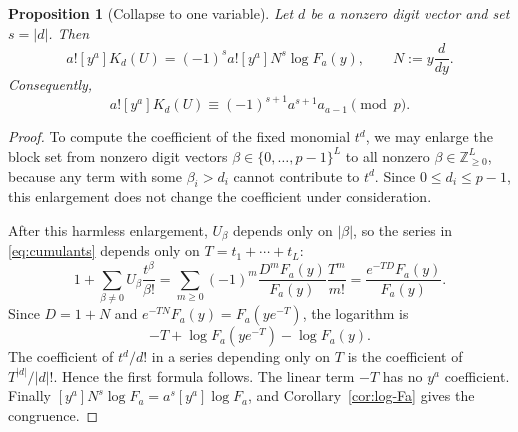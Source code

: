 \documentclass[11pt]{amsart}
\numberwithin{equation}{section}
\newtheorem{proposition}[proposition]{Proposition}
\begin{document}
\begin{proposition}[Collapse to one variable]\label{prop:cumulant-collapse}
Let $d$ be a nonzero digit vector and set $s=|d|$.  Then
\[
        a![y^a]K_d(U)=(-1)^s a![y^a]N^s\log F_a(y),
        \qquad
        N:=y\frac{d}{dy}.
\]
Consequently,
\[
        a![y^a]K_d(U)\equiv (-1)^{s+1}a^{s+1}a_{a-1}\pmod p.
\]
\end{proposition}
\begin{proof}
To compute the coefficient of the fixed monomial $t^d$, we may enlarge the block set from nonzero digit vectors $\beta\in\{0,\ldots,p-1\}^L$ to all nonzero $\beta\in\mathbb Z_{\ge0}^L$, because any term with some $\beta_i>d_i$ cannot contribute to $t^d$.  Since $0\le d_i\le p-1$, this enlargement does not change the coefficient under consideration.

After this harmless enlargement, $U_\beta$ depends only on $|\beta|$, so the series in \eqref{eq:cumulants} depends only on $T=t_1+\cdots+t_L$:
\[
        1+\sum_{\beta\ne0}U_\beta\frac{t^\beta}{\beta!}
        =\sum_{m\ge0}(-1)^m\frac{D^mF_a(y)}{F_a(y)}\frac{T^m}{m!}
        =\frac{e^{-TD}F_a(y)}{F_a(y)}.
\]
Since $D=1+N$ and $e^{-TN}F_a(y)=F_a(ye^{-T})$, the logarithm is
\[
        -T+\log F_a(ye^{-T})-\log F_a(y).
\]
The coefficient of $t^d/d!$ in a series depending only on $T$ is the coefficient of $T^{|d|}/|d|!$.  Hence the first formula follows.  The linear term $-T$ has no $y^a$ coefficient.  Finally $[y^a]N^s\log F_a=a^s[y^a]\log F_a$, and Corollary~\ref{cor:log-Fa} gives the congruence.
\end{proof}
\end{document}
